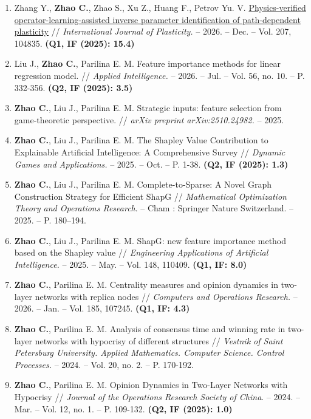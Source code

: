 \documentclass[letterpaper,10pt]{article}
\begin{document}
\begin{enumerate}[itemsep=2pt,parsep=0pt]
  \fontsize{10}{10.5}\selectfont
  \item Zhang Y., \textbf{Zhao C.}, Zhao S., Xu Z., Huang F., Petrov Yu. V.
        \href{https://doi.org/10.1016/j.ijplas.2026.104835}{Physics-verified
        operator-learning-assisted inverse parameter identification of
        path-dependent plasticity} // {\it International Journal of
        Plasticity.} -- 2026. -- Dec. -- Vol. 207, 104835. {\bf (Q1, IF (2025):
        15.4)}
  \item Liu J., \textbf{Zhao C.}, Parilina E. M. Feature importance methods for
        linear regression model. // {\it Applied Intelligence.} -- 2026. --
        Jul. -- Vol. 56, no. 10. -- P. 332-356. {\bf (Q2, IF (2025): 3.5)}
  \item \textbf{Zhao C.}, Liu J., Parilina E. M. Strategic inputs: feature selection from game-theoretic perspective. // {\it arXiv preprint arXiv:2510.24982.} -- 2025.
  \item \textbf{Zhao C.}, Liu J., Parilina E. M. The Shapley Value Contribution to Explainable Artificial Intelligence: A Comprehensive Survey // {\it Dynamic Games and Applications.} -- 2025. -- Oct. -- P. 1-38. {\bf (Q2, IF (2025): 1.3)}
  \item \textbf{Zhao C.}, Liu J., Parilina E. M. Complete-to-Sparse: A Novel Graph Construction Strategy for Efficient ShapG // {\it Mathematical Optimization Theory and Operations Research}. -- Cham : Springer Nature Switzerland. -- 2025. -- P. 180–194.
  \item \textbf{Zhao C.}, Liu J., Parilina E. M. ShapG: new feature importance method based on the Shapley value // {\it Engineering Applications of Artificial Intelligence.} -- 2025. -- May. -- Vol. 148, 110409. {\bf (Q1, IF: 8.0)}
        \newpage
  \item \textbf{Zhao C.}, Parilina E. M. Centrality measures and opinion dynamics in two-layer networks with replica nodes // {\it Computers and Operations Research.} -- 2026. -- Jan. -- Vol. 185, 107245. {\bf (Q1, IF: 4.3)}
  \item \textbf{Zhao C.}, Parilina E. M. Analysis of consensus time and winning rate in two-layer networks with hypocrisy of different structures // {\it Vestnik of Saint Petersburg University. Applied Mathematics. Computer Science. Control Processes.} -- 2024. -- Vol. 20, no. 2. -- P. 170-192.
  \item \textbf{Zhao C.}, Parilina E. M. Opinion Dynamics in Two-Layer Networks with Hypocrisy // {\it Journal of the Operations Research Society of China}. -- 2024. -- Mar. -- Vol. 12, no. 1. -- P. 109-132. {\bf (Q2, IF (2025): 1.0)}

\end{enumerate}
\end{document}
